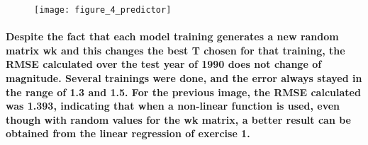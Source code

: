 \documentclass[a4paper]{article}
\begin{document}
\begin{figure}[H]
    \centering
    \texttt{[image: figure\_4\_predictor]}
    \caption{}
    \label{fig:ex2-4}
\end{figure}

\paragraph{Despite the fact that each model training generates a new random matrix wk and this changes the best T chosen for that training, the RMSE calculated over the test year of 1990 does not change of magnitude. Several trainings were done, and the error always stayed in the range of 1.3 and 1.5. For the previous image, the RMSE calculated was 1.393, indicating that when a non-linear function is used, even though with random values for the wk matrix, a better result can be obtained from the linear regression of exercise 1.}

\end{document}
